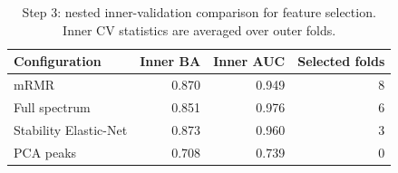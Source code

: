 \begin{table}[t]
\centering
\caption{Step 3: nested inner-validation comparison for feature selection. Inner CV statistics are averaged over outer folds.}
\label{tab:step3_candidates}
\small
\begin{tabular}{lrrr}
\toprule
Configuration & Inner BA & Inner AUC & Selected folds \\
\midrule
mRMR & 0.870 & 0.949 & 8 \\
Full spectrum & 0.851 & 0.976 & 6 \\
Stability Elastic-Net & 0.873 & 0.960 & 3 \\
PCA peaks & 0.708 & 0.739 & 0 \\
\bottomrule
\end{tabular}
\end{table}
